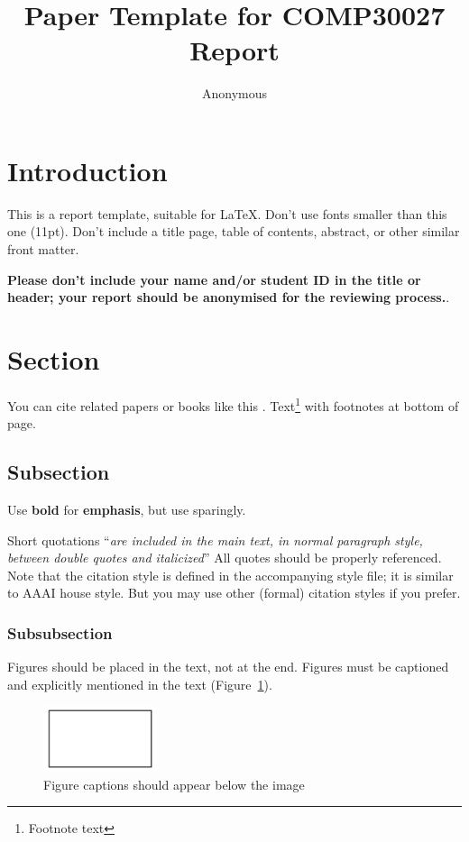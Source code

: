 \documentclass[11pt]{article}
\title{Paper Template for COMP30027 Report}
\author
{Anonymous}
\begin{document}
\maketitle



\section{Introduction}

This is a report template, suitable for \LaTeX. Don't use fonts smaller than this one (11pt). Don't include a title page,
table of contents, abstract, or other similar front matter.

\textbf{Please don't include your name and/or student ID in the title or header; your report should be anonymised for the reviewing process.}.


\section{Section}

You can cite related papers or books like this \cite{bishop2006pattern}. Text\footnote{Footnote text} with footnotes at bottom of page.

\subsection{Subsection}

Use \textbf{bold} for \textbf{emphasis}, but use sparingly. 

Short quotations ``\textit{are included in the main text, in normal paragraph style, between double quotes and italicized}'' All quotes should be properly referenced. Note that the citation style is defined in the accompanying
style file; it is similar to AAAI house style. But you may use other (formal) citation styles if you prefer.

\subsubsection{Subsubsection}

Figures should be placed in the text, not at the end. Figures must be captioned and explicitly mentioned in the text (Figure~\ref{fig:sample}). 
\begin{figure}[!h]
	\centering
	\includegraphics[width = 0.3\textwidth]{sample-figure.png}
	\caption{Figure captions should appear below the image}
	\label{fig:sample}
\end{figure}
\end{document}
